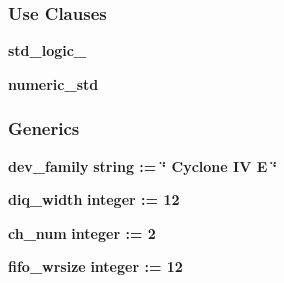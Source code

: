 \subsubsection*{Use Clauses}
 \begin{DoxyCompactItemize}
\item 
{\bf std\+\_\+logic\+\_}   
\item 
{\bf numeric\+\_\+std}   
\end{DoxyCompactItemize}
\subsubsection*{Generics}
 \begin{DoxyCompactItemize}
\item 
{\bf dev\+\_\+family} {\bfseries {\bfseries \textcolor{comment}{string}\textcolor{vhdlchar}{ }\textcolor{vhdlchar}{ }\textcolor{vhdlchar}{\+:}\textcolor{vhdlchar}{=}\textcolor{vhdlchar}{ }\textcolor{vhdlchar}{ }\textcolor{vhdlchar}{ }\textcolor{vhdlchar}{ }\textcolor{keyword}{\char`\"{} Cyclone I\+V E \char`\"{}}\textcolor{vhdlchar}{ }}}
\item 
{\bf diq\+\_\+width} {\bfseries {\bfseries \textcolor{comment}{integer}\textcolor{vhdlchar}{ }\textcolor{vhdlchar}{ }\textcolor{vhdlchar}{\+:}\textcolor{vhdlchar}{=}\textcolor{vhdlchar}{ }\textcolor{vhdlchar}{ } \textcolor{vhdldigit}{12} \textcolor{vhdlchar}{ }}}
\item 
{\bf ch\+\_\+num} {\bfseries {\bfseries \textcolor{comment}{integer}\textcolor{vhdlchar}{ }\textcolor{vhdlchar}{ }\textcolor{vhdlchar}{\+:}\textcolor{vhdlchar}{=}\textcolor{vhdlchar}{ }\textcolor{vhdlchar}{ } \textcolor{vhdldigit}{2} \textcolor{vhdlchar}{ }}}
\item 
{\bf fifo\+\_\+wrsize} {\bfseries {\bfseries \textcolor{comment}{integer}\textcolor{vhdlchar}{ }\textcolor{vhdlchar}{ }\textcolor{vhdlchar}{\+:}\textcolor{vhdlchar}{=}\textcolor{vhdlchar}{ }\textcolor{vhdlchar}{ } \textcolor{vhdldigit}{12} \textcolor{vhdlchar}{ }}}
\end{DoxyCompactItemize}
